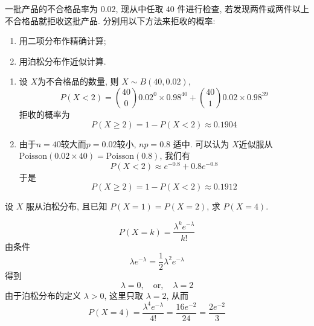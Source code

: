 \documentclass[../main.tex]{subfiles}
\begin{document}
\begin{exercise}{}{}
一批产品的不合格品率为 $0.02$, 现从中任取 $40$ 件进行检查, 若发现两件或两件以上不合格品就拒收这批产品. 分别用以下方法来拒收的概率:
\begin{enumerate}
\item 用二项分布作精确计算;
\item 用泊松分布作近似计算.
\end{enumerate}
\end{exercise}
\begin{solution}
      \begin{enumerate}
        \item 设 \(  X  \)为不合格品的数量, 则 \(  X\sim B\left( 40,0.02 \right)   \), \[
        P\left( X< 2 \right)= \binom{ 40 }{0  }0.02^{0}\times 0.98^{40}+ \binom{ 40 }{1  }0.02\times 0.98^{39}   
        \]  拒收的概率为 \[
        P\left( X\ge 2 \right)= 1-P\left( X< 2 \right)\approx  0.1904
        \]
        \item 由于$n=40$较大而$p=0.02$较小, \(  np= 0.8  \)  适中. 可以认为 \(  X  \)近似服从\(  \mathrm{Poisson}\left( 0.02 \times 40\right)= \mathrm{Poisson}\left( 0.8 \right)    \),   我们有 \[
        P\left( X< 2 \right)\approx  e^{-0.8}+ 0.8e^{-0.8} 
        \]于是 \[
        P\left( X\ge 2 \right)= 1-P\left( X< 2 \right)\approx   0.1912\]
    \end{enumerate}
    
\end{solution}

\begin{exercise}{}{}
设 $X$ 服从泊松分布, 且已知 $P(X=1) = P(X=2)$, 求 $P(X=4)$.
\end{exercise}
\begin{solution}
      \[
     P\left( X= k \right)= \frac{  \lambda ^{k}e^{- \lambda }}{k! }  
     \]由条件 \[
      \lambda e^{- \lambda }=  \frac{1 }{2 } \lambda ^{2}e^{- \lambda }
     \]得到 \[
      \lambda = 0,\quad \text{or},\quad  \lambda = 2
     \]由于泊松分布的定义 \(   \lambda > 0  \), 这里只取 \(   \lambda = 2  \), 从而 $$P(X=4) = \frac{\lambda^4 e^{-\lambda}}{4!}= \frac{16e^{-2}}{24} = \frac{2e^{-2}}{3}$$
\end{solution}
\end{document}

